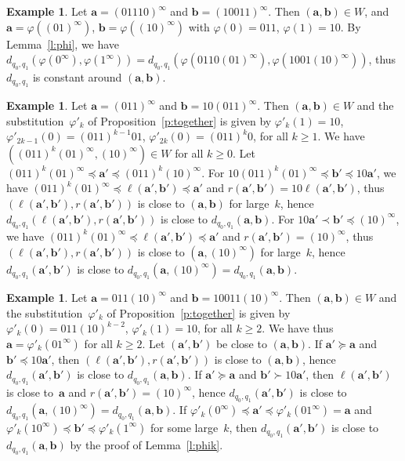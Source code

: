 \documentclass{amsart}
\theoremstyle{definition}
\newtheorem{example}[theorem]{Example}
\numberwithin{equation}{section}
\newcommand{\ba}{\mathbf{a}}
\newcommand{\bb}{\mathbf{b}}
\begin{document}
\begin{example}\label{ex4}
Let $\ba=(01110)^\infty$ and $\bb=(10011)^\infty$.
Then $(\ba,\bb) \in W$, and $\ba = \varphi((01)^\infty)$, $\bb = \varphi((10)^\infty)$ with $\varphi(0) = 011$, $\varphi(1) = 10$.
By Lemma~\ref{l:phi}, we have $d_{q_0,q_1}(\varphi(0^\infty),\varphi(1^\infty)) = d_{q_0,q_1}(\varphi(0110(01)^\infty),\varphi(1001(10)^\infty))$, thus $d_{q_0,q_1}$ is constant around $(\ba,\bb)$. 
\end{example}

\begin{example}\label{ex5}
Let $\ba=(011)^\infty$ and $\bb=10(011)^\infty$.
Then $(\ba, \bb) \in W$ and the substitution~$\varphi'_k$ of Proposition~\ref{p:together} is given by $\varphi'_k(1) = 10$, $\varphi'_{2k-1}(0) = (011)^{k-1}01$, $\varphi'_{2k}(0) = (011)^k0$, for all $k \ge 1$.
We have $((011)^k(01)^\infty,(10)^\infty) \in W$ for all $k \ge 0$.
Let $(011)^k(01)^\infty \preceq \ba' \preceq (011)^k(10)^\infty$.
For $10(011)^k(01)^\infty \preceq \bb' \preceq 10\ba'$, we have $(011)^k(01)^\infty \preceq \ell(\ba',\bb') \preceq \ba'$ and $r(\ba',\bb') = 10\ell(\ba',\bb')$, thus $(\ell(\ba',\bb'), r(\ba',\bb'))$ is close to $(\ba,\bb)$ for large~$k$, hence $d_{q_0,q_1}(\ell(\ba',\bb'), r(\ba',\bb'))$ is close to $d_{q_0,q_1}(\ba,\bb)$.
For $10\ba' \prec \bb' \preceq (10)^\infty$, we have $(011)^k(01)^\infty \preceq \ell(\ba',\bb') \preceq \ba'$ and $r(\ba',\bb') = (10)^\infty$, thus $(\ell(\ba',\bb'), r(\ba',\bb'))$ is close to $(\ba,(10)^\infty)$ for large~$k$, hence $d_{q_0,q_1}(\ba',\bb')$ is close to $d_{q_0,q_1}(\ba,(10)^\infty) = d_{q_0,q_1}(\ba,\bb)$.
\end{example}


\begin{example}\label{ex6}
Let $\ba = 011(10)^\infty$ and $\bb = 10011(10)^\infty$.
Then $(\ba, \bb) \in W$ and the substitution~$\varphi'_k$ of Proposition~\ref{p:together} is given by $\varphi'_k(0) = 011(10)^{k-2}$, $\varphi'_k(1) = 10$, for all $k \ge 2$.
We have thus $\ba = \varphi'_k(01^\infty)$ for all $k \ge 2$.
Let $(\ba',\bb')$ be close to $(\ba,\bb)$.
If $\ba' \succeq \ba$ and $\bb' \preceq 10\ba'$, then $(\ell(\ba',\bb'), r(\ba',\bb'))$ is close to $(\ba,\bb)$, hence $d_{q_0,q_1}(\ba',\bb')$ is close to $d_{q_0,q_1}(\ba,\bb)$.
If $\ba' \succeq \ba$ and $\bb' \succ 10\ba'$, then $\ell(\ba',\bb')$ is close to~$\ba$ and $r(\ba',\bb') = (10)^\infty$, hence $d_{q_0,q_1}(\ba',\bb')$ is close to $d_{q_0,q_1}(\ba,(10)^\infty) = d_{q_0,q_1}(\ba,\bb)$.
If $\varphi'_k(0^\infty) \preceq \ba' \preceq \varphi'_k(01^\infty) = \ba$ and $\varphi'_k(10^\infty) \preceq \bb' \preceq \varphi'_k(1^\infty)$ for some large~$k$, then $d_{q_0,q_1}(\ba',\bb')$ is close to $d_{q_0,q_1}(\ba,\bb)$ by the proof of Lemma~\ref{l:phik}.
\end{example}
\end{document}
